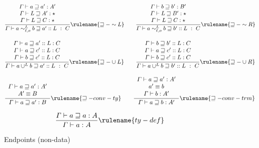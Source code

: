 \begin{figure}
  \begin{align*}
    \frac{\begin{array}{c}
    \varGamma\vdash a\sqsupseteq a':A'\\
    \varGamma\vdash L\sqsupseteq A':\star\\
    \varGamma\vdash L\sqsupseteq C:\star
    \end{array}}{\varGamma\vdash a\sim_{\ell,o}^{L}b\sqsupseteq a'::L\ :\ C}\rulename{\sqsupseteq-\sim L}
    \quad & \quad 
    \frac{\begin{array}{c}
    \varGamma\vdash b\sqsupseteq b':B'\\
    \varGamma\vdash L\sqsupseteq B':\star\\
    \varGamma\vdash L\sqsupseteq C:\star
    \end{array}}{\varGamma\vdash a\sim_{\ell,o}^{L}b\sqsupseteq b'::L\ :\ C}\rulename{\sqsupseteq-\sim R}
  \\
  \end{align*}
  
  \begin{align*}
    \frac{\begin{array}{c}
    \varGamma\vdash a\sqsupseteq a'::L:C\\
    \varGamma\vdash a\sqsupseteq c'::L:C\\
    \varGamma\vdash b\sqsupseteq c'::L:C
    \end{array}}{\varGamma\vdash a\cup^{L}b\sqsupseteq a'::L\ :\ C}\rulename{\sqsupseteq-\cup L}
    \quad & \quad 
    \frac{\begin{array}{c}
    \varGamma\vdash b\sqsupseteq b'::L:C\\
    \varGamma\vdash a\sqsupseteq c'::L:C\\
    \varGamma\vdash b\sqsupseteq c'::L:C
    \end{array}}{\varGamma\vdash a\cup^{L}b\sqsupseteq b'::L\ :\ C}\rulename{\sqsupseteq-\cup R}
  \\
  \end{align*}
  
  \begin{align*}
    \frac{\begin{array}{c}
    \varGamma\vdash a\sqsupseteq a':A'\\
    A'\equiv B
    \end{array}}{\varGamma\vdash a\sqsupseteq a':B}\rulename{\sqsupseteq-conv-ty}
    \quad & \quad 
    \frac{\begin{array}{c}
    \varGamma\vdash a\sqsupseteq a':A'\\
    a'\equiv b\\
    \varGamma\vdash b:A'
    \end{array}}{\varGamma\vdash a\sqsupseteq b:A'}\rulename{\sqsupseteq-conv-trm}
  \\
  \end{align*}
  
  \[
  \frac{\varGamma\vdash a\sqsupseteq a:A}{\varGamma\vdash a:A}\rulename{ty-def}
  \]
\caption{Endpoints (non-data)}
\label{fig:cast-endpoint-rules}
\end{figure}




